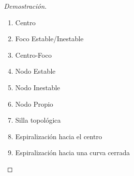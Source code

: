 \begin{proof}[Demostración]
	\begin{enumerate}
		\item Centro
		\item Foco Estable/Inestable
		\item Centro-Foco
		\item Nodo Estable
		\item Nodo Inestable
		\item Nodo Propio
		\item Silla topológica
		\item Espiralización hacia el centro
		\item Espiralización hacia una curva cerrada
	\end{enumerate}
\end{proof}



